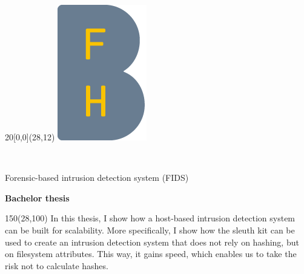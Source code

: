%
%

\begin{titlepage}


\setlength{\unitlength}{1mm}
\begin{textblock}{20}[0,0](28,12)
	\includegraphics[scale=1.0]{../img/BFH_Logo_B.png}
\end{textblock}

\begin{flushleft}

\vspace*{21mm}

\fontsize{26pt}{40pt}\selectfont 
\heading				\\							%
\vspace{2mm}

\fontsize{16pt}{24pt}\selectfont\vspace{0.3em}
Forensic-based intrusion detection system	(FIDS)		\\				%
\vspace{5mm}

\fontsize{10pt}{12pt}\selectfont
\textbf{Bachelor thesis} \\		%
\vspace{7mm}

\begin{textblock}{150}(28,100)
\fontsize{10pt}{12pt}\selectfont
In this thesis, I show how a host-based intrusion detection system can be built for scalability. More specifically, I show how the sleuth kit can be used to create an intrusion detection system that does not rely on hashing, but on filesystem attributes. This way, it gains speed, which enables us to take the risk not to calculate hashes.
\end{textblock}


\end{flushleft}
\end{titlepage}
